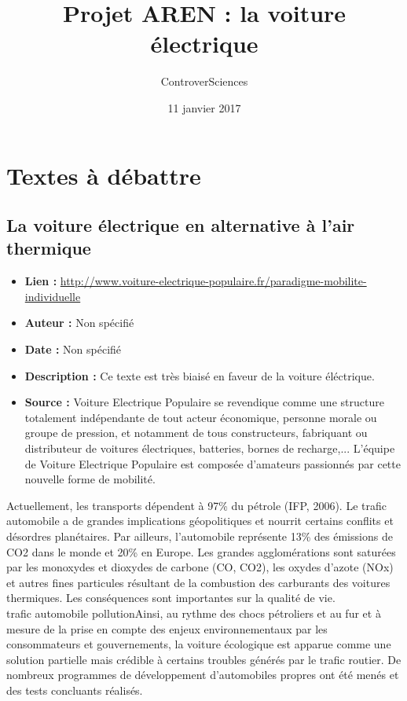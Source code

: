 \documentclass[8pt]{article}
\author{ControverSciences}
\title{Projet AREN : la voiture électrique}
\date{11 janvier 2017}
\begin{document}
\maketitle

\tableofcontents
\newpage

\section{Textes à débattre}
\subsection{La voiture électrique en alternative à l’air thermique}
\begin{itemize}
	\item \textbf{Lien : }  \url{http://www.voiture-electrique-populaire.fr/paradigme-mobilite-individuelle} 
	\item \textbf{Auteur : } Non spécifié
	\item \textbf{Date : } Non spécifié
	\item \textbf{Description : } Ce texte est très biaisé en faveur de la voiture éléctrique.
	\item \textbf{Source : }  Voiture Electrique Populaire se revendique comme  une structure totalement indépendante de tout acteur économique, personne morale ou groupe de pression, et notamment de tous constructeurs, fabriquant ou distributeur de voitures électriques, batteries, bornes de recharge,... L’équipe de Voiture Electrique Populaire est composée d’amateurs passionnés par cette nouvelle forme de mobilité.
\end{itemize}


Actuellement, les transports dépendent à 97\% du pétrole (IFP, 2006). Le trafic automobile a de grandes implications géopolitiques et nourrit certains conflits et désordres planétaires. Par ailleurs, l’automobile représente 13\% des émissions de CO2 dans le monde et 20\% en Europe. Les grandes agglomérations sont saturées par les monoxydes et dioxydes de carbone (CO, CO2), les oxydes d’azote (NOx) et autres fines particules résultant de la combustion des carburants des voitures thermiques. Les conséquences sont importantes sur la qualité de vie.\\

trafic automobile pollutionAinsi, au rythme des chocs pétroliers et au fur et à mesure de la prise en compte des enjeux environnementaux par les consommateurs et gouvernements, la voiture écologique est apparue comme une solution partielle mais crédible à certains troubles générés par le trafic routier. De nombreux programmes de développement d’automobiles propres ont été menés et des tests concluants réalisés.\\
\end{document}
